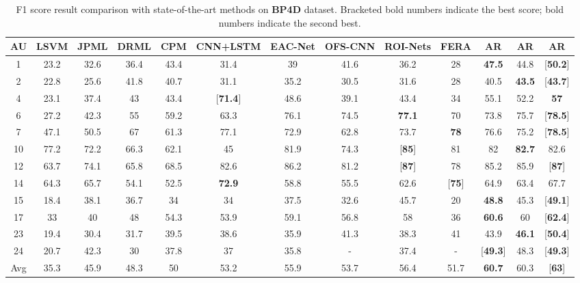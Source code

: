 \documentclass[5p,twocolumn]{elsarticle}
\begin{document}
\begin{table*}[htp]
	
	
	\scriptsize
	\setlength{\abovecaptionskip}{0pt} 
	
	\caption{F1 score result comparison with state-of-the-art methods on \textbf{BP4D} dataset. Bracketed bold numbers indicate the best score; bold numbers indicate the second best.}
	\label{tab:BP4D_F1}
	\centering
	\tabcolsep=0.1cm
	\begin{tabular}{c*{9}{c}ccc}
		\toprule
		AU & LSVM & JPML \cite{Zhao2016} & DRML \cite{Zhao2016b} & CPM \cite{zeng2015confidence} & CNN+LSTM \cite{Chu2017Learning} & EAC-Net \cite{li2017eac} & OFS-CNN \cite{han2017optimizing} & ROI-Nets \cite{li2017action} & FERA \cite{jaiswal2016deep} & AR & AR & AR \\
		\midrule
1 & 23.2 & 32.6 & 36.4 & 43.4 & 31.4 & 39 & 41.6 & 36.2 & 28 & \textbf{47.5} & 44.8 & [\textbf{50.2}] \\
2 & 22.8 & 25.6 & 41.8 & 40.7 & 31.1 & 35.2 & 30.5 & 31.6 & 28 & 40.5 & \textbf{43.5} & [\textbf{43.7}] \\
4 & 23.1 & 37.4 & 43 & 43.4 & [\textbf{71.4}] & 48.6 & 39.1 & 43.4 & 34 & 55.1 & 52.2 & \textbf{57} \\
6 & 27.2 & 42.3 & 55 & 59.2 & 63.3 & 76.1 & 74.5 & \textbf{77.1} & 70 & 73.8 & 75.7 & [\textbf{78.5}] \\
7 & 47.1 & 50.5 & 67 & 61.3 & 77.1 & 72.9 & 62.8 & 73.7 & \textbf{78} & 76.6 & 75.2 & [\textbf{78.5}] \\
10 & 77.2 & 72.2 & 66.3 & 62.1 & 45 & 81.9 & 74.3 & [\textbf{85}] & 81 & 82 & \textbf{82.7} & 82.6 \\
12 & 63.7 & 74.1 & 65.8 & 68.5 & 82.6 & 86.2 & 81.2 & [\textbf{87}] & 78 & 85.2 & 85.9 & [\textbf{87}] \\
14 & 64.3 & 65.7 & 54.1 & 52.5 & \textbf{72.9} & 58.8 & 55.5 & 62.6 & [\textbf{75}] & 64.9 & 63.4 & 67.7 \\
15 & 18.4 & 38.1 & 36.7 & 34 & 34 & 37.5 & 32.6 & 45.7 & 20 & \textbf{48.8} & 45.3 & [\textbf{49.1}] \\
17 & 33 & 40 & 48 & 54.3 & 53.9 & 59.1 & 56.8 & 58 & 36 & \textbf{60.6} & 60 & [\textbf{62.4}] \\
23 & 19.4 & 30.4 & 31.7 & 39.5 & 38.6 & 35.9 & 41.3 & 38.3 & 41 & 43.9 & \textbf{46.1} & [\textbf{50.4}] \\
24 & 20.7 & 42.3 & 30 & 37.8 & 37 & 35.8 & - & 37.4 & - & [\textbf{49.3}] & 48.3 & [\textbf{49.3}] \\
\midrule
Avg & 35.3 & 45.9 & 48.3 & 50 & 53.2 & 55.9 & 53.7 & 56.4 & 51.7 & \textbf{60.7} & 60.3 & [\textbf{63}] \\
\bottomrule
	\end{tabular}
\end{table*}
\end{document}
